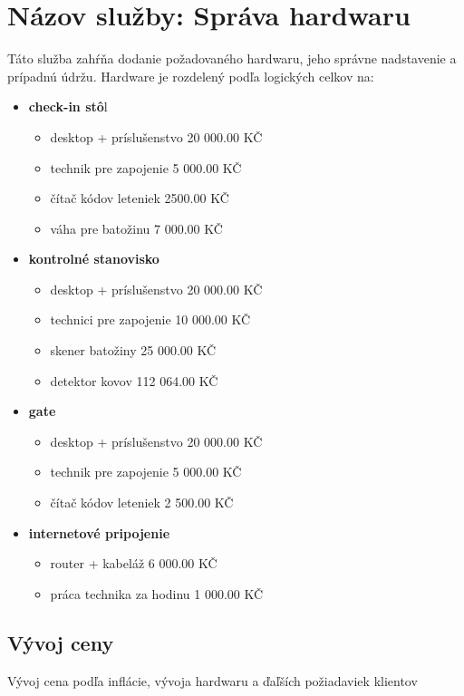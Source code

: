 \documentclass[a4paper, 11pt]{article}
\begin{document}
\section*{Názov služby: Správa hardwaru}
Táto služba zahŕňa dodanie požadovaného hardwaru, jeho správne nadstavenie a prípadnú údržu. Hardware je rozdelený podľa logických celkov na:
 \begin{itemize}
\item \textbf{check-in stô}l
\begin{itemize}
\item desktop + príslušenstvo 20 000.00 KČ
\item technik pre zapojenie 5 000.00 KČ
\item čítač kódov leteniek 2500.00 KČ
\item váha pre batožinu 7 000.00 KČ
\end{itemize}


\item  \textbf{kontrolné stanovisko}
\begin{itemize}
\item desktop + príslušenstvo 20 000.00 KČ
\item technici pre zapojenie 10 000.00 KČ
\item skener batožiny 25 000.00 KČ
\item detektor kovov 112 064.00 KČ
\end{itemize}

\item  \textbf{gate}
\begin{itemize}
\item desktop + príslušenstvo 20 000.00 KČ
\item technik pre zapojenie 5 000.00 KČ
\item čítač kódov leteniek 2 500.00 KČ
\end{itemize}

\item  \textbf{internetové pripojenie}
\begin{itemize}
\item router + kabeláž 6 000.00 KČ
\item práca technika za hodinu 1 000.00 KČ
\end{itemize}

\end{itemize}

\subsection*{Vývoj ceny}
Vývoj cena podľa inflácie, vývoja hardwaru a ďaľších požiadaviek klientov
\end{document}
